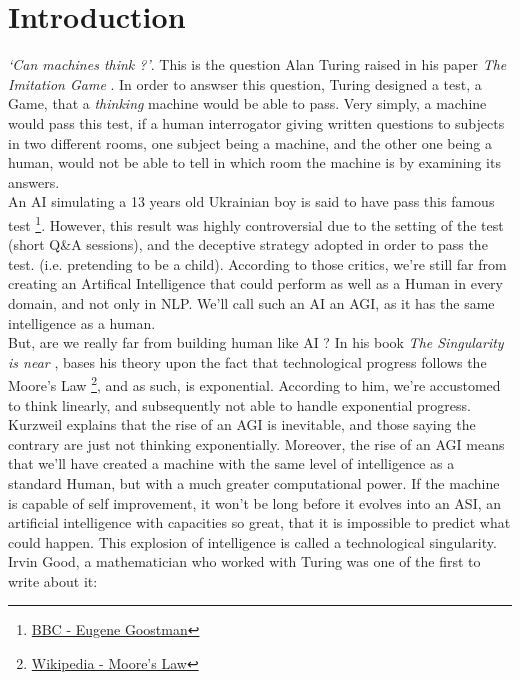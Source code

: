 \documentclass[12pt]{article}
\begin{document}
\section*{Introduction}\label{introduction}

\smallskip

{\em \lq Can machines think ?\rq }. This is the question Alan Turing raised in
his paper {\em The Imitation Game} \cite{Turing}. In order to answser this
question, Turing designed a test, a Game, that a {\em thinking} machine would be
able to pass. Very simply, a machine would pass this test, if a human
interrogator giving written questions to subjects in two different rooms, one
subject being a machine, and the other one being a human, would not be able to
tell in which room the machine is by examining its answers. \\

An AI simulating a 13 years old Ukrainian boy is said to have pass this famous
test \footnote{\href{http://www.bbc.com/news/technology-27762088} {BBC - Eugene
Goostman}}. However, this result was highly controversial due to the setting of
the test (short Q\&A sessions), and the deceptive strategy adopted in order to
pass the test. (i.e. pretending to be a child). According to those critics,
we're still far from creating an Artifical Intelligence that could perform as
well as a Human in every domain, and not only in \gls{NLP}. We'll call such an
AI an \gls{AGI}, as it has the same intelligence as a human. \\

But, are we really far from building human like AI ? In his book {\em The
Singularity is near} \cite{Kurzweil}, bases his theory upon the fact that
technological progress follows the Moore's Law
\footnote{\href{https://en.wikipedia.org/wiki/Moore\%27s_law} {Wikipedia -
Moore's Law} }, and as such, is exponential. According to him, we're accustomed
to think linearly, and subsequently not able to handle exponential progress.
Kurzweil explains that the rise of an \gls{AGI} is inevitable, and those saying
the contrary are just not thinking exponentially. Moreover, the rise of an
\gls{AGI} means that we'll have created a machine with the same level of
intelligence as a standard Human, but with a much greater computational power.
If the machine is capable of self improvement, it won't be long before it
evolves into an \gls{ASI}, an artificial intelligence with capacities so great,
that it is impossible to predict what could happen. This explosion of
intelligence is called a technological singularity. Irvin Good, a mathematician
who worked with Turing was one of the first to write about it: \\
\end{document}
